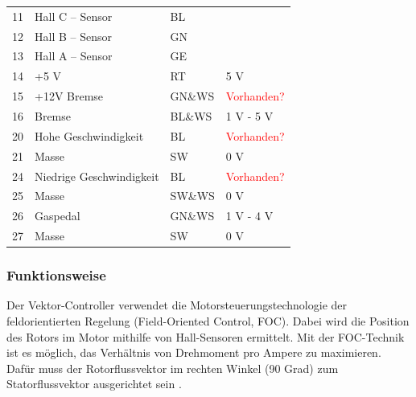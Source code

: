 \begin{table}[!ht]
\begin{tabular}{lll|l}
		\multicolumn{1}{l|}{11}      & Hall C – Sensor          & BL                          &                             \\
		\multicolumn{1}{l|}{12}      & Hall B – Sensor          & GN                          &                             \\
		\multicolumn{1}{l|}{13}      & Hall A – Sensor          & GE                          &                             \\
		\multicolumn{1}{l|}{14}      & +5 V                     & RT                          & 5 V                         \\
		\multicolumn{1}{l|}{15}      & +12V Bremse              & GN\&WS                      & \textcolor{red}{Vorhanden?} \\
		\multicolumn{1}{l|}{16}      & Bremse                   & BL\&WS                      & 1 V - 5 V                   \\
		\multicolumn{1}{l|}{20}      & Hohe Geschwindigkeit     & BL                          & \textcolor{red}{Vorhanden?} \\
		\multicolumn{1}{l|}{21}      & Masse                    & SW                          & 0 V                         \\
		\multicolumn{1}{l|}{24}      & Niedrige Geschwindigkeit & BL                          & \textcolor{red}{Vorhanden?} \\
		\multicolumn{1}{l|}{25}      & Masse                    & SW\&WS                      & 0 V                         \\
		\multicolumn{1}{l|}{26}      & Gaspedal                 & GN\&WS                      & 1 V - 4 V                   \\
		\multicolumn{1}{l|}{27}      & Masse                    & SW                          & 0 V                         \\ \hline
	\end{tabular}
\end{table}
\pagebreak[4]

\subsubsection{Funktionsweise}
\label{Vector_Controller:Funktionsweise}
Der Vektor-Controller verwendet die Motorsteuerungstechnologie der feldorientierten Regelung (Field-Oriented Control, FOC). Dabei wird die Position des Rotors im Motor mithilfe von Hall-Sensoren ermittelt. Mit der FOC-Technik ist es möglich, das Verhältnis von Drehmoment pro Ampere zu maximieren. Dafür muss der Rotorflussvektor im rechten Winkel (90 Grad) zum Statorflussvektor ausgerichtet sein \cite{Golden_Motor:Vector_Controller}.


